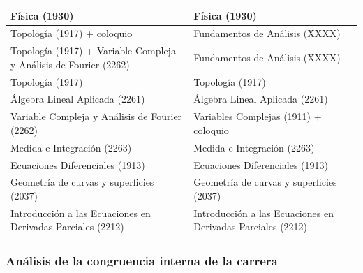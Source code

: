 \documentclass[a4paper, 12pt]{article}
\begin{document}
\begin{center}
\begin{tabularx}{1\textwidth}{|>{\raggedright\arraybackslash}X |
>{\raggedright\arraybackslash}X |}
Física          (1930)                & Física    (1930)             \\ \hline

Topología   (1917) + coloquio & Fundamentos de Análisis   (XXXX)                      \\
\hline
Topología   (1917) + Variable Compleja y Análisis de Fourier (2262) & Fundamentos de Análisis   (XXXX)                      \\
\hline



Topología   (1917)                &Topología   (1917)       \\
\hline

Álgebra Lineal Aplicada (2261)      & Álgebra Lineal Aplicada (2261)       \\\hline

Variable Compleja y Análisis de Fourier (2262) & Variables Complejas (1911) + coloquio                 \\
\hline

Medida e Integración (2263)   & Medida e Integración (2263) \\
\hline

Ecuaciones Diferenciales    (1913)     &Ecuaciones Diferenciales (1913)   \\
\hline

Geometría de curvas y superficies  (2037)  & Geometría de curvas y superficies  (2037)
\\\hline

Introducción a las Ecuaciones en Derivadas Parciales (2212) & 
Introducción a las Ecuaciones en Derivadas Parciales (2212)
\\\hline
\end{tabularx}
\end{center}

\normalfont
\newpage


\subsubsection{Análisis de la congruencia interna de la carrera}
\fontsize{10pt}{10pt}\selectfont 
 
\end{document}
